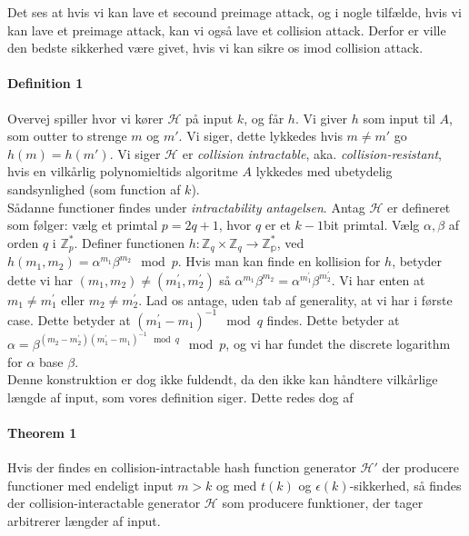 \documentclass[paper=a4, fontsize=11pt]{scrartcl} %
\numberwithin{equation}{section} %
\numberwithin{figure}{section} %
\numberwithin{table}{section} %
\begin{document}
	Det ses at hvis vi kan lave et secound preimage attack, og i nogle tilfælde, hvis vi kan lave et preimage attack, kan vi også lave et collision attack. Derfor er ville den bedste sikkerhed være givet, hvis vi kan sikre os imod collision attack.
	
	\paragraph{\textbf{Definition 1}} Overvej spiller hvor vi kører $\mathcal{H}$ på input $k$, og får $h$. Vi giver $h$ som input til $A$, som outter to strenge $m$ og $m'$. Vi siger, dette lykkedes hvis $m\not=m'$ go $h(m)=h(m')$. Vi siger $\mathcal{H}$ er \textit{collision intractable}, aka. \textit{collision-resistant}, hvis en vilkårlig polynomieltids algoritme $A$ lykkedes med ubetydelig sandsynlighed (som function af $k$). \\
	
	Sådanne functioner findes under \textit{intractability antagelsen}. Antag $\mathcal{H}$ er defineret som følger: vælg et primtal $p=2q+1$, hvor $q$ er et $k-1$bit primtal. Vælg $\alpha, \beta$ af orden $q$ i $\mathbb{Z}^*_p$. Definer functionen $h:\mathbb{Z}_q \times\mathbb{Z}_q\rightarrow \mathbb{Z_p^*}$, ved $h(m_1,m_2)=\alpha^{m_1}\beta^{m_2}\mod{p}$. Hvis man kan finde en kollision for $h$, betyder dette vi har $(m_1,m_2)\not=(m^{'}_1,m^{'}_2)$ så $\alpha^{m_1}\beta^{m_2}=\alpha^{m_1^{'}}\beta^{m_2^{'}}$. Vi har enten at $m_1\not=m_1^{'}$ eller $m_2\not=m_2^{'}$. Lad os antage, uden tab af generality, at vi har i første case. Dette betyder at $(m_1^{'}-m_1)^{-1}\mod{q}$ findes. Dette betyder at $\alpha=\beta^{(m_2-m_2^{'})(m_1^{'}-m_1)^{-1}\mod{q}}\mod{p}$, og vi har fundet the discrete logarithm for $\alpha$ base $\beta$. \\
	
	Denne konstruktion er dog ikke fuldendt, da den ikke kan håndtere vilkårlige længde af input, som vores definition siger. Dette redes dog af
	
	\paragraph{\textbf{Theorem 1}} Hvis der findes en collision-intractable hash function generator $\mathcal{H}'$ der producere functioner med endeligt input $m>k$ og med $t(k)$ og $\epsilon(k)$-sikkerhed, så findes der collision-interactable generator $\mathcal{H}$ som producere funktioner, der tager arbitrerer længder af input.
	
\end{document}
